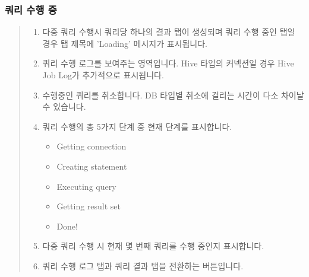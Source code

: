 \documentclass[letterpaper,10pt,english]{sphinxmanual}
\begin{document}
\subsubsection{쿼리 수행 중}
\label{\detokenize{discovery/part06/06_03-use_a_workbench:id6}}\begin{quote}

\begin{figure}[H]
\centering

\noindent{}
\end{figure}
\begin{enumerate}
\def\theenumi{\arabic{enumi}}
\def\labelenumi{\theenumi .}
\makeatletter\def\p@enumii{\p@enumi \theenumi .}\makeatother
\item {} 
 다중 쿼리 수행시 쿼리당 하나의 결과 탭이 생성되며 쿼리 수행 중인 탭일 경우 탭 제목에 'Loading' 메시지가 표시됩니다.

\item {} 
 쿼리 수행 로그를 보여주는 영역입니다. Hive 타입의 커넥션일 경우 Hive Job Log가 추가적으로 표시됩니다.

\item {} 
 수행중인 쿼리를 취소합니다. DB 타입별 취소에 걸리는 시간이 다소 차이날 수 있습니다.

\item {} 
 쿼리 수행의 총 5가지 단계 중 현재 단계를 표시합니다.
\begin{itemize}
\item {} 
Getting connection

\item {} 
Creating statement

\item {} 
Executing query

\item {} 
Getting result set

\item {} 
Done!

\end{itemize}

\item {} 
 다중 쿼리 수행 시 현재 몇 번째 쿼리를 수행 중인지 표시합니다.

\item {} 
 쿼리 수행 로그 탭과 쿼리 결과 탭을 전환하는 버튼입니다.


\end{enumerate}
\end{quote}
\end{document}
